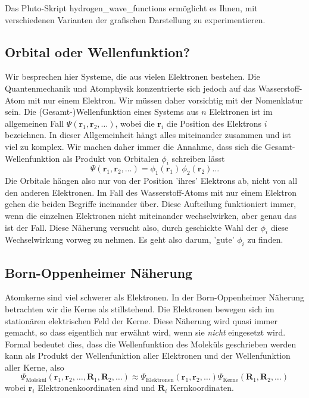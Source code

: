 Das Pluto-Skript hydrogen\_wave\_functions ermöglicht es Ihnen, mit verschiedenen Varianten der grafischen Darstellung zu experimentieren.


\subsection{Orbital oder Wellenfunktion?}

Wir besprechen hier Systeme, die  aus vielen Elektronen bestehen. Die Quantenmechanik und Atomphysik konzentrierte sich jedoch auf das Wasserstoff-Atom mit nur einem Elektron. Wir müssen daher vorsichtig mit der Nomenklatur sein. Die (Gesamt-)Wellenfunktion eines Systems aus $n$ Elektronen ist im allgemeinen Fall $\Psi(\mathbf{r}_1, \mathbf{r}_2, \dots)$, wobei die $\mathbf{r}_i$ die Position des Elektrons $i$ bezeichnen. In dieser Allgemeinheit hängt alles miteinander zusammen und ist viel zu komplex. Wir machen daher immer die Annahme, dass sich die Gesamt-Wellenfunktion als Produkt von Orbitalen $\phi_i$ schreiben lässt
\begin{equation}
\Psi(\mathbf{r}_1, \mathbf{r}_2, \dots) = \phi_1(\mathbf{r}_1) \, \phi_2(\mathbf{r}_2)  \dots
\end{equation}
Die Orbitale hängen also nur von der Position 'ihres' Elektrons ab, nicht von all den anderen Elektronen. Im Fall des Wasserstoff-Atoms mit nur einem Elektron gehen die beiden Begriffe ineinander über.
Diese Aufteilung funktioniert immer, wenn die einzelnen Elektronen nicht miteinander wechselwirken, aber genau das ist der Fall. Diese Näherung versucht also, durch geschickte Wahl der $\phi_i$ diese Wechselwirkung vorweg zu nehmen. Es geht also darum, 'gute' $\phi_i$ zu finden.

\subsection{Born-Oppenheimer Näherung}

Atomkerne sind viel schwerer als Elektronen. In der Born-Oppenheimer Näherung betrachten wir die Kerne als stillstehend. Die Elektronen bewegen sich im stationären elektrischen Feld der Kerne. Diese Näherung wird quasi immer gemacht, so dass eigentlich nur erwähnt wird, wenn sie \emph{nicht} eingesetzt wird. Formal bedeutet dies, dass die Wellenfunktion des Moleküls geschrieben werden kann als Produkt der Wellenfunktion aller Elektronen und der Wellenfunktion aller Kerne, also
\begin{equation}
\Psi_{\text{Molekül}}(\mathbf{r}_1, \mathbf{r}_2, \dots, \mathbf{R}_1, \mathbf{R}_2, \dots)
  \approx
  \Psi_{\text{Elektronen}}(\mathbf{r}_1, \mathbf{r}_2, \dots )
\Psi_{\text{Kerne}}( \mathbf{R}_1, \mathbf{R}_2, \dots)
\end{equation}
wobei $\mathbf{r}_i$ Elektronenkoordinaten sind und $\mathbf{R}_i$ Kernkoordinaten.


